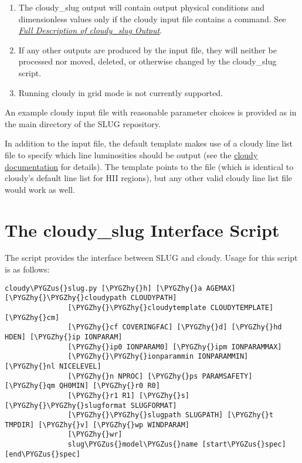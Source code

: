 \documentclass[letterpaper,10pt,english]{sphinxmanual}
\def\PYGZus{\char`\_}
\def\PYGZhy{\char`\-}
\begin{document}
\begin{enumerate}
\item {} 
The cloudy\_slug output will contain output physical conditions and
dimensionless values only if the cloudy input file contains a
 command. See
{\hyperref[cloudy:ssec\string-cloudy\string-output]{\emph{Full Description of cloudy\_slug Output}}}.

\item {} 
If any other outputs are produced by the input file, they will
neither be processed nor moved, deleted, or otherwise changed by
the cloudy\_slug script.

\item {} 
Running cloudy in grid mode is not currently supported.

\end{enumerate}

An example cloudy input file with reasonable parameter choices is
provided as  in the main directory
of the SLUG repository.

In addition to the input file, the default template makes use of a
cloudy line list file to specify which line luminosities should be
output (see the \href{http://nublado.org}{cloudy documentation} for
details). The template points to the file
 (which is identical to cloudy's
default line list for HII regions), but any other valid cloudy line
list file would work as well.


\section{The cloudy\_slug Interface Script}
\label{cloudy:ssec-cloudy-slug-options}\label{cloudy:the-cloudy-slug-interface-script}
The  script provides the interface between SLUG and
cloudy. Usage for this script is as follows:

\begin{Verbatim}[commandchars=\\\{\}]
cloudy\PYGZus{}slug.py [\PYGZhy{}h] [\PYGZhy{}a AGEMAX] [\PYGZhy{}\PYGZhy{}cloudypath CLOUDYPATH]
               [\PYGZhy{}\PYGZhy{}cloudytemplate CLOUDYTEMPLATE] [\PYGZhy{}cm]
               [\PYGZhy{}cf COVERINGFAC] [\PYGZhy{}d] [\PYGZhy{}hd HDEN] [\PYGZhy{}ip IONPARAM]
               [\PYGZhy{}ip0 IONPARAM0] [\PYGZhy{}ipm IONPARAMMAX]
               [\PYGZhy{}\PYGZhy{}ionparammin IONPARAMMIN] [\PYGZhy{}nl NICELEVEL]
               [\PYGZhy{}n NPROC] [\PYGZhy{}ps PARAMSAFETY] [\PYGZhy{}qm QH0MIN] [\PYGZhy{}r0 R0]
               [\PYGZhy{}r1 R1] [\PYGZhy{}s] [\PYGZhy{}\PYGZhy{}slugformat SLUGFORMAT]
               [\PYGZhy{}\PYGZhy{}slugpath SLUGPATH] [\PYGZhy{}t TMPDIR] [\PYGZhy{}v] [\PYGZhy{}wp WINDPARAM]
               [\PYGZhy{}wr]
               slug\PYGZus{}model\PYGZus{}name [start\PYGZus{}spec] [end\PYGZus{}spec]
\end{Verbatim}
\end{document}
